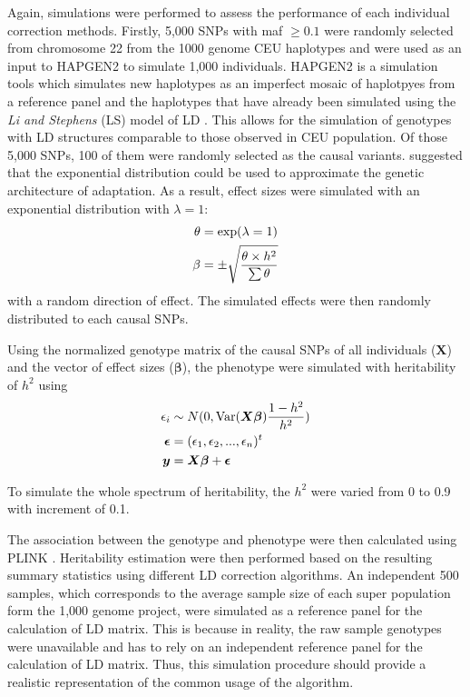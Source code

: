 		Again, simulations were performed to assess the performance of each individual correction methods.
		Firstly, 5,000 \glspl{SNP} with \gls{maf} $\ge0.1$ were randomly selected from chromosome 22 from the 1000 genome \gls{CEU} haplotypes and were used as an input to HAPGEN2 \citep{Su2011} to simulate 1,000 individuals.
		HAPGEN2 is a simulation tools which simulates new haplotypes as an imperfect mosaic of haplotpyes from a reference panel and the haplotypes that have already been simulated using the \textit{Li and Stephens} (LS) model of \gls{LD} \citep{Li2003}.
		This allows for the simulation of genotypes with \gls{LD} structures comparable to those observed in \gls{CEU} population. 
		Of those 5,000 \glspl{SNP}, 100 of them were randomly selected as the causal variants. 
		\citet{Orr1998} suggested that the exponential distribution could be used to approximate the genetic architecture of adaptation. 
		As a result, effect sizes were simulated with an exponential distribution with $\lambda=1$:
		\begin{align}
		\theta&=\mathrm{exp}(\lambda=1)\notag\\
		\beta&=\pm\sqrt{\frac{\theta \times h^2}{\sum \theta}}
		\label{eq:randomEffect}
		\end{align}
		with a random direction of effect.
		The simulated effects were then randomly distributed to each causal \glspl{SNP}.
			
		Using the normalized genotype matrix of the causal \glspl{SNP} of all individuals ($\boldsymbol{X}$) and the vector of effect sizes ($\boldsymbol{\beta}$), the phenotype were simulated with heritability of $h^2$ using
		\begin{align}
		\epsilon_i&\sim N(0,\mathrm{Var}(\boldsymbol{X\beta})\frac{1-h^2}{h^2} )\notag\\
		\boldsymbol{\epsilon} &= (\epsilon_1,\epsilon_2,...,\epsilon_n)^t\notag\\
		\boldsymbol{y} &= \boldsymbol{X\beta}+\boldsymbol{\epsilon}
		\label{eq:simulationOfPhenotype}
		\end{align}
		
		To simulate the whole spectrum of heritability, the $h^2$ were varied from 0 to 0.9 with increment of 0.1.
		
		The association between the genotype and phenotype were then calculated using PLINK \citep{Purcell2007}.
		Heritability estimation were then performed based on the resulting summary statistics using different \gls{LD} correction algorithms.
		An independent 500 samples, which corresponds to the average sample size of each super population form the 1,000 genome project, were simulated as a reference panel for the calculation of \gls{LD} matrix.
		This is because in reality, the raw sample genotypes were unavailable and has to rely on an independent reference panel for the calculation of \gls{LD} matrix. 
		Thus, this simulation procedure should provide a realistic representation of the common usage of the algorithm.
		
